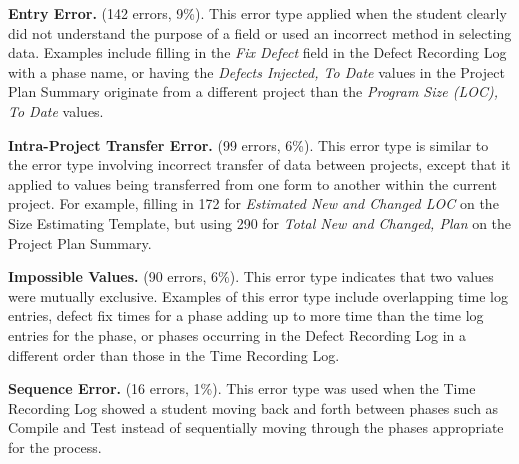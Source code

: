 {\bf Entry Error.}  (142 errors, 9\%).
This error type applied when the student clearly did not understand the
purpose of a field or used an incorrect method in selecting data.  Examples
include filling in the {\it Fix Defect} field in the Defect Recording Log
with a phase name, or having the {\it Defects Injected, To Date} values in
the Project Plan Summary originate from a different project than the {\it
  Program Size (LOC), To Date} values.

{\bf Intra-Project Transfer Error.} (99 errors, 6\%). 
This error type is similar to the error type involving incorrect transfer
of data between projects, except that it applied to values being
transferred from one form to another within the current project.  For
example, filling in 172 for {\it Estimated New and Changed LOC} on the Size
Estimating Template, but using 290 for {\it Total New and Changed, Plan} on
the Project Plan Summary.

{\bf Impossible Values.} (90 errors, 6\%).
This error type indicates that two values were mutually exclusive.
Examples of this error type include overlapping time log entries, defect
fix times for a phase adding up to more time than the time log entries for
the phase, or phases occurring in the Defect Recording Log in a different
order than those in the Time Recording Log.

{\bf Sequence Error.} (16 errors, 1\%).
This error type was used when the Time Recording Log showed a student
moving back and forth between phases such as Compile and Test instead of
sequentially moving through the phases appropriate for the process. \\
 


